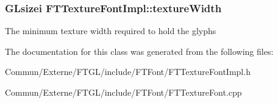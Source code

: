 \subsubsection[{\texorpdfstring{texture\+Width}{textureWidth}}]{\setlength{\rightskip}{0pt plus 5cm}G\+Lsizei F\+T\+Texture\+Font\+Impl\+::texture\+Width\hspace{0.3cm}{\ttfamily [private]}}\hypertarget{class_f_t_texture_font_impl_a997a027dbc2b7f96b2dd0bac9b38a3c5}{}\label{class_f_t_texture_font_impl_a997a027dbc2b7f96b2dd0bac9b38a3c5}
The minimum texture width required to hold the glyphs 

The documentation for this class was generated from the following files\+:\begin{DoxyCompactItemize}
\item 
Commun/\+Externe/\+F\+T\+G\+L/include/\+F\+T\+Font/F\+T\+Texture\+Font\+Impl.\+h\item 
Commun/\+Externe/\+F\+T\+G\+L/include/\+F\+T\+Font/F\+T\+Texture\+Font.\+cpp\end{DoxyCompactItemize}
